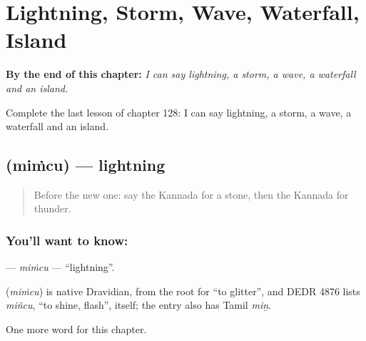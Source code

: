 
\chapter{Lightning, Storm, Wave, Waterfall, Island}
\label{ch:ka-lightning-storm-wave-waterfall-island}

\begin{chapteropening}
\textbf{By the end of this chapter:} \emph{I can say lightning, a storm, a wave, a waterfall and an island.}

Complete the last lesson of chapter 128: I can say lightning, a storm, a wave, a waterfall and an island.
\end{chapteropening}

\section[\texorpdfstring{\kn{ಮಿಂಚು} (miṁcu)}{ಮಿಂಚು (miṁcu)}]{ (miṁcu) — lightning}

\label{lesson:KA-C128-mimcu}



\begin{quote}
Before the new one: say the Kannada for a stone, then the Kannada for thunder.
\end{quote}

\subsection*{You'll want to know: }
\textbf{} — \emph{miṁcu} — \textquotedblleft{}lightning\textquotedblright{}.

\begin{cousinweb}
\textbf{} (\emph{miṁcu}) is native Dravidian, from the root for \textquotedblleft{}to glitter\textquotedblright{}, and DEDR 4876 lists \emph{miñcu}, \textquotedblleft{}to shine, flash\textquotedblright{}, itself; the entry also has Tamil \emph{miṉ}.
\end{cousinweb}

\begin{grammarlens}[title={What you've built}]
One more word for this chapter.
\end{grammarlens}

